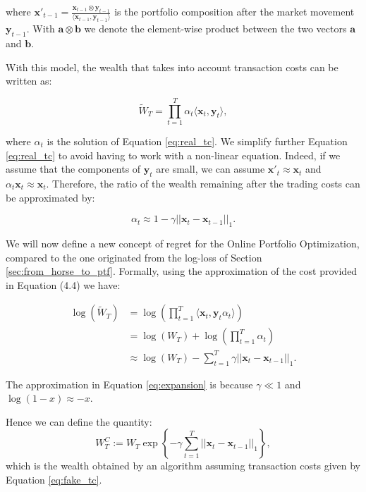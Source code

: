where $\mathbf{x'}_{t-1} = \frac{\mathbf{x}_{t-1} \otimes \mathbf{y}_{t-1} }{\langle \mathbf{x}_{t-1}, \mathbf{y}_{t-1} \rangle }$ is the portfolio composition after the market movement $\mathbf{y}_{t-1}$.  With $ \mathbf{a} \otimes \mathbf{b}$ we denote the element-wise product between the two vectors $\mathbf{a}$ and $\mathbf{b}$.

With this model, the wealth that takes into account transaction costs
can be written as:

\begin{equation} \label{eq:realwealth}
    \tilde W_T = \prod\limits_{t=1}^T \alpha_t\langle \mathbf{x}_t, \mathbf{y}_t \rangle,
\end{equation}

where $\alpha_t$ is the solution of Equation \eqref{eq:real_tc}. We simplify further Equation \eqref{eq:real_tc} to avoid having to work with a non-linear equation. Indeed, if we assume that the components of $\mathbf y_t$ are small, we can assume $\mathbf x'_t\approx \mathbf x_t$ and $\alpha_t\mathbf x_t\approx\mathbf x_t$. Therefore, the ratio of the wealth remaining after the trading costs can be approximated by:

\begin{equation}\label{eq:fake_tc}
\alpha_t\approx1-\gamma||\mathbf x_t-\mathbf x_{t-1}||_1.
\end{equation}

We will now define a new concept of regret for the Online Portfolio Optimization, compared to the one originated from the log-loss of Section \ref{sec:from_horse_to_ptf}. 
Formally, using the approximation of the cost provided in Equation (4.4) we have:

\begin{align}
    \log(\tilde W_T)&=\log\left(\prod\limits_{t=1}^T  \langle \mathbf{x}_t, \mathbf{y}_t \alpha_t\rangle\right) \\ 
    & = \log(W_T)+\log\left(\prod\limits_{t=1}^T \alpha_t\right) \\ 
    & \approx \log(W_T) - \sum\limits_{t=1}^T\gamma||\mathbf{x}_t-\mathbf{x}_{t-1}||_1. \label{eq:expansion}
\end{align}

The approximation in Equation \eqref{eq:expansion} is because $\gamma\ll1$ and $\log(1-x)\approx-x$.

Hence we can define the quantity:
\begin{equation}\label{eq:l1_wealth}
W_T^C:=W_T\exp\left\{-\gamma\sum\limits_{t=1}^T||\mathbf{x}_t-\mathbf{x}_{t-1}||_1\right\},
\end{equation} 
which is the wealth obtained by an algorithm assuming transaction costs given by Equation \eqref{eq:fake_tc}.


